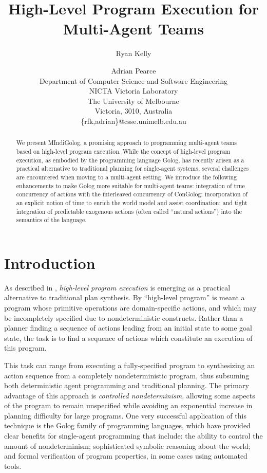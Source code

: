 \documentclass[letterpaper]{article}
\title{High-Level Program Execution for Multi-Agent Teams}
\author{Ryan Kelly \and Adrian Pearce \\
Department of Computer Science and Software Engineering \\
NICTA Victoria Laboratory \\
The University of Melbourne \\
Victoria, 3010, Australia \\
\{rfk,adrian\}@csse.unimelb.edu.au}
\begin{document}
\maketitle

\begin{abstract}
We present MIndiGolog, a promising approach to programming multi-agent teams
based on high-level program execution. While the concept of high-level program
execution, as embodied by the programming language Golog, has recently arisen
as a practical
alternative to traditional planning for single-agent systems, several
challenges are encountered when moving to a multi-agent setting.  We introduce
the following enhancements to make Golog more suitable for multi-agent teams:
integration of true concurrency of actions with the interleaved concurrency
of ConGolog; incorporation of an explicit notion of time to enrich the world
model and assist coordination; and tight integration of predictable
exogenous actions (often called ``natural actions'') into the semantics of
the language.
\end{abstract}

\section{Introduction}

As described in \cite{giacomo99indigolog}, \emph{high-level program execution}
is emerging as a practical alternative to traditional plan
synthesis. By ``high-level program'' is meant a program whose
primitive operations are domain-specific actions, and which may be
incompletely specified due to nondeterministic constructs. Rather
than a planner finding a sequence of actions leading from an initial
state to some goal state, the task is to
find a sequence of actions which constitute an execution of this program.

This task can range from executing a fully-specified program to synthesizing
an action sequence from a completely nondeterministic program, thus
subsuming both deterministic agent programming and traditional planning.
The primary advantage of this approach is \emph{controlled nondeterminism},
allowing some aspects of the program to remain unspecified while avoiding
an exponential increase in planning difficulty for large programs.
One very successful application of this technique is the Golog \cite{levesque97golog}
family of programming languages, which have provided clear benefits
for single-agent programming that include: the ability to control
the amount of nondeterminism; sophisticated symbolic reasoning about
the world; and formal verification of program properties, in some
cases using automated tools.
\end{document}
